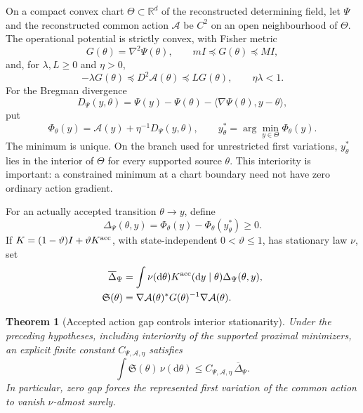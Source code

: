 \documentclass[11pt]{article}
\newtheorem{theorem}{Theorem}[section]
\theoremstyle{definition}
\theoremstyle{remark}
\newcommand{\R}{\mathbb R}
\newcommand{\dd}{\mathrm d}
\begin{document}
On a compact convex chart $\Theta\subset\R^d$ of the reconstructed determining
field, let $\Psi$ and the reconstructed common action $\mathcal A$ be $C^2$ on
an open neighbourhood of $\Theta$.  The operational potential is strictly
convex, with Fisher metric
\begin{equation}
 G(\theta)=\nabla^2\Psi(\theta),
 \qquad mI\preceq G(\theta)\preceq MI,
 \label{eq:main-fisher-metric}
\end{equation}
and, for $\lambda,L\ge0$ and $\eta>0$,
\begin{equation}
 -\lambda G(\theta)\preceq D^2\mathcal A(\theta)
 \preceq L G(\theta),\qquad \eta\lambda<1.
 \label{eq:main-action-hessian}
\end{equation}
For the Bregman divergence~\cite{Bregman1967}
\begin{equation}
 D_\Psi(y,\theta)=\Psi(y)-\Psi(\theta)
       -\langle\nabla\Psi(\theta),y-\theta\rangle,
 \label{eq:main-bregman}
\end{equation}
put
\begin{equation}
 \Phi_\theta(y)=\mathcal A(y)+\eta^{-1}D_\Psi(y,\theta),
 \qquad y_\theta^*=\arg\min_{y\in\Theta}\Phi_\theta(y).
 \label{eq:main-proximal-action}
\end{equation}
The minimum is unique.  On the branch used for unrestricted first variations,
$y_\theta^*$ lies in the interior of $\Theta$ for every supported source
$\theta$.  This interiority is important: a constrained minimum at a chart
boundary need not have zero ordinary action gradient.

For an actually accepted transition $\theta\to y$, define
\begin{equation}
 \boxed{\Delta_\Psi(\theta,y)
       =\Phi_\theta(y)-\Phi_\theta(y_\theta^*)\ge0.}
 \label{eq:main-action-gap}
\end{equation}
If $K=(1-\vartheta)I+\vartheta K^{\rm acc}$, with state-independent
$0<\vartheta\le1$, has stationary law $\nu$, set
\begin{equation}
 \begin{aligned}
 \overline\Delta_\Psi
  &=\int\nu(\dd\theta)K^{\rm acc}(\dd y\mid\theta)
                          \Delta_\Psi(\theta,y),\\
 \mathfrak S(\theta)
  &=\nabla\mathcal A(\theta)^*G(\theta)^{-1}\nabla\mathcal A(\theta).
 \end{aligned}
 \label{eq:main-stationarity-gap}
\end{equation}

\begin{theorem}[Accepted action gap controls interior stationarity]
\label{thm:main-action-stationarity}
Under the preceding hypotheses, including interiority of the supported
proximal minimizers, an explicit finite constant
$C_{\Psi,\mathcal A,\eta}$ satisfies
\begin{equation}
 \boxed{\int\mathfrak S(\theta)\,\nu(\dd\theta)
       \le C_{\Psi,\mathcal A,\eta}\,\overline\Delta_\Psi.}
 \label{eq:main-stationarity-bound}
\end{equation}
In particular, zero gap forces the represented first variation of the common
action to vanish $\nu$-almost surely.
\end{theorem}
\end{document}
